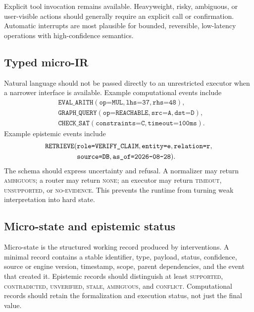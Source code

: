 \documentclass[11pt]{article}
\begin{document}
Explicit tool invocation remains available.  Heavyweight, risky, ambiguous, or
user-visible actions should generally require an explicit call or confirmation.
Automatic interrupts are most plausible for bounded, reversible, low-latency
operations with high-confidence semantics.

\subsection{Typed micro-IR}

Natural language should not be passed directly to an unrestricted executor when
a narrower interface is available.  Example computational events include
\[
\begin{split}
&\texttt{EVAL\_ARITH}(\texttt{op=MUL},\texttt{lhs=37},\texttt{rhs=48}),\\
&\texttt{GRAPH\_QUERY}(\texttt{op=REACHABLE},\texttt{src=A},\texttt{dst=D}),\\
&\texttt{CHECK\_SAT}(\texttt{constraints=C},\texttt{timeout=100ms}).
\end{split}
\]
Example epistemic events include
\[
\begin{split}
\texttt{RETRIEVE}(&\texttt{role=VERIFY\_CLAIM},
\texttt{entity=e},\texttt{relation=r},\\
&\texttt{source=DB},\texttt{as\_of=2026\mbox{-}08\mbox{-}28}).
\end{split}
\]
The schema should express uncertainty and refusal.  A normalizer may return
\textsc{ambiguous}; a router may return \textsc{none}; an executor may return
\textsc{timeout}, \textsc{unsupported}, or \textsc{no-evidence}.  This prevents
the runtime from turning weak interpretation into hard state.

\subsection{Micro-state and epistemic status}

Micro-state is the structured working record produced by interventions.  A
minimal record contains a stable identifier, type, payload, status, confidence,
source or engine version, timestamp, scope, parent dependencies, and the event
that created it.  Epistemic records should distinguish at least
\textsc{supported}, \textsc{contradicted}, \textsc{unverified}, \textsc{stale},
\textsc{ambiguous}, and \textsc{conflict}.  Computational records should retain
the formalization and execution status, not just the final value.
\end{document}
